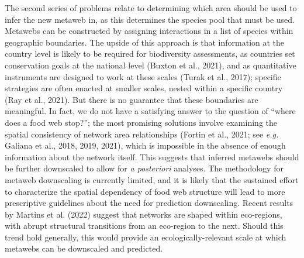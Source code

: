 \documentclass[10pt,oneside]{article}
\begin{document}
The second series of problems relate to determining which area should be
used to infer the new metaweb in, as this determines the species pool
that must be used. Metawebs can be constructed by assigning interactions
in a list of species within geographic boundaries. The upside of this
approach is that information at the country level is likely to be
required for biodiversity assessments, as countries set conservation
goals at the national level (Buxton et al., 2021), and as quantitative
instruments are designed to work at these scales (Turak et al., 2017);
specific strategies are often enacted at smaller scales, nested within a
specific country (Ray et al., 2021). But there is no guarantee that
these boundaries are meaningful. In fact, we do not have a satisfying
answer to the question of ``where does a food web stop?''; the most
promising solutions involve examining the spatial consistency of network
area relationships (Fortin et al., 2021; see \emph{e.g.} Galiana et al.,
2018, 2019, 2021), which is impossible in the absence of enough
information about the network itself. This suggests that inferred
metawebs should be further downscaled to allow for \emph{a posteriori}
analyses. The methodology for metaweb downscaling is currently limited,
and it is likely that the sustained effort to characterize the spatial
dependency of food web structure will lead to more prescriptive
guidelines about the need for prediction downscaling. Recent results by
Martins et al. (2022) suggest that networks are shaped within
eco-regions, with abrupt structural transitions from an eco-region to
the next. Should this trend hold generally, this would provide an
ecologically-relevant scale at which metawebs can be downscaled and
predicted.
\end{document}
